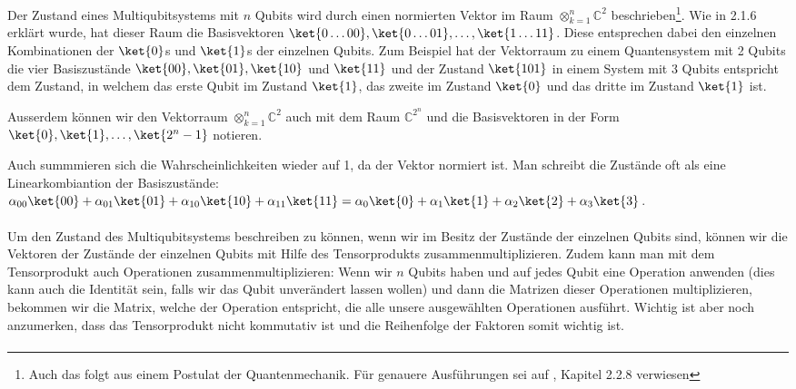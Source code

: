 Der Zustand eines Multiqubitsystems mit $n$ Qubits wird durch einen normierten Vektor im Raum $\otimes_{k = 1}^{n} \mathbb{C}^2$ beschrieben\footnote{Auch das folgt aus einem Postulat der Quantenmechanik. Für genauere Ausführungen sei auf \cite{QC}, Kapitel 2.2.8 verwiesen}. Wie in 2.1.6 erklärt wurde, hat dieser Raum die Basisvektoren $\ket{0\dots 00}, \ket{0\dots 01}, \dots, \ket{1\dots 11}$. Diese entsprechen dabei den einzelnen Kombinationen der $\ket{0}$s und $\ket{1}$s der einzelnen Qubits. Zum Beispiel hat der Vektorraum zu einem Quantensystem mit 2 Qubits die vier Basiszustände $\ket{00}, \ket{01}, \ket{10}$ und $\ket{11}$ und der Zustand $\ket{101}$ in einem System mit 3 Qubits entspricht dem Zustand, in welchem das erste Qubit im Zustand $\ket{1}$, das zweite im Zustand $\ket{0}$ und das dritte im Zustand $\ket{1}$ ist. 

Ausserdem können wir den Vektorraum $\otimes_{k = 1}^{n} \mathbb{C}^2$ auch mit dem Raum $\mathbb{C}^{2^n}$ und die Basisvektoren in der Form $\ket{0}, \ket{1}, \dots, \ket{2^n - 1}$ notieren.

Auch summmieren sich die Wahrscheinlichkeiten wieder auf 1, da der Vektor normiert ist. Man schreibt die Zustände oft als eine Linearkombiantion der Basiszustände: $\alpha_{00}\ket{00} + \alpha_{01}\ket{01} + \alpha_{10}\ket{10} + \alpha_{11}\ket{11} = \alpha_{0}\ket{0} + \alpha_{1}\ket{1} + \alpha_{2}\ket{2} + \alpha_{3}\ket{3}$.

\paragraph{}
Um den Zustand des Multiqubitsystems beschreiben zu können, wenn wir im Besitz der Zustände der einzelnen Qubits sind, können wir die Vektoren der Zustände der einzelnen Qubits mit Hilfe des Tensorprodukts zusammenmultiplizieren. Zudem kann man mit dem Tensorprodukt auch Operationen zusammenmultiplizieren: Wenn wir $n$ Qubits haben und auf jedes Qubit eine Operation anwenden (dies kann auch die Identität sein, falls wir das Qubit unverändert lassen wollen) und dann die Matrizen dieser Operationen multiplizieren, bekommen wir die Matrix, welche der Operation entspricht, die alle unsere ausgewählten Operationen ausführt. Wichtig ist aber noch anzumerken, dass das Tensorprodukt nicht kommutativ ist und die Reihenfolge der Faktoren somit wichtig ist.
\paragraph{}

